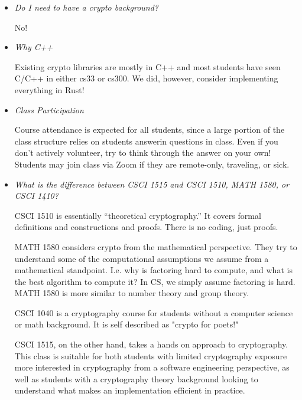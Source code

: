\begin{itemize}
    \item \emph{Do I need to have a crypto background?} 
    
    No!

    \item \emph{Why C++}

    Existing crypto libraries are mostly in C++ and most students have seen C/C++ in either cs33 or cs300. We did, however, consider implementing everything in Rust!

    \item \emph{Class Participation}

    Course attendance is expected for all students, since a large portion of the class structure relies on students answerin questions in class. Even if you don't actively volunteer, try to think through the answer on your own! Students may join class via Zoom if they are remote-only, traveling, or sick.

    \item \emph{What is the difference between CSCI 1515 and CSCI 1510, MATH 1580, or CSCI 1410?}
    
    CSCI 1510 is essentially ``theoretical cryptography.'' It covers formal definitions and constructions and proofs. There is no coding, just proofs.

    MATH 1580 considers crypto from the mathematical perspective. They try to understand some of the computational assumptions we assume from a mathematical standpoint. I.e. why is factoring hard to compute, and what is the best algorithm to compute it? In CS, we simply assume factoring is hard. MATH 1580 is more similar to number theory and group theory. 

    CSCI 1040 is a cryptography course for students without a computer science or math background. It is self described as "crypto for poets!"

    CSCI 1515, on the other hand, takes a hands on approach to cryptography. This class is suitable for both students with limited cryptography exposure more interested in cryptography from a software engineering perspective, as well as students with a cryptography theory background looking to understand what makes an implementation efficient in practice.

\end{itemize}
